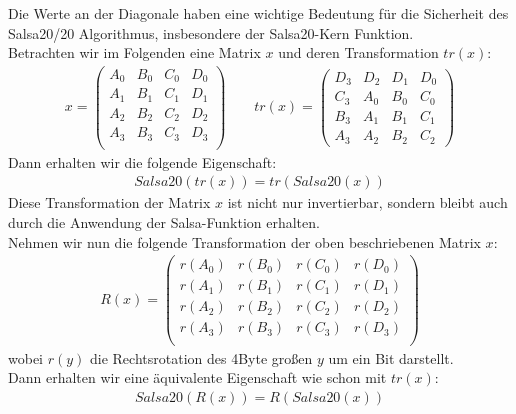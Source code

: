 \documentclass[course=erap]{aspdoc}
\begin{document}
Die Werte an der Diagonale haben eine wichtige Bedeutung für die Sicherheit des Salsa20/20 Algorithmus, insbesondere der Salsa20-Kern Funktion.
\vspace{1mm}
\\Betrachten wir im Folgenden eine Matrix $x$ und deren Transformation $tr(x)$:
\begin{gather*}
    x =
    \begin{pmatrix}
    A_0 & B_0 & C_0 & D_0\\
    A_1 & B_1 & C_1 & D_1\\
    A_2 & B_2 & C_2 & D_2\\
    A_3 & B_3 & C_3 & D_3\\
    \end{pmatrix}  
\quad \quad tr(x) = 
    \begin{pmatrix}
        D_3 & D_2 & D_1 & D_0\\
        C_3 & A_0 & B_0 & C_0\\
        B_3 & A_1 & B_1 & C_1\\
        A_3 & A_2 & B_2 & C_2
    \end{pmatrix}
\end{gather*}
Dann erhalten wir die folgende Eigenschaft:
\begin{gather*}
Salsa20( tr(x) ) = tr( Salsa20(x) )
\end{gather*}
Diese Transformation der Matrix $x$ ist nicht nur invertierbar, sondern bleibt auch durch die Anwendung der Salsa-Funktion erhalten.\cite{salsa20security} 
\vspace{1mm}
\\Nehmen wir nun die folgende Transformation der oben beschriebenen Matrix $x$:
\begin{gather*}
R(x) =
    \begin{pmatrix}
        r(A_0) & r(B_0) & r(C_0) & r(D_0)\\
        r(A_1) & r(B_1) & r(C_1) & r(D_1)\\
        r(A_2) & r(B_2) & r(C_2) & r(D_2)\\
        r(A_3) & r(B_3) & r(C_3) & r(D_3)\\
    \end{pmatrix}
\end{gather*}
wobei $r(y)$ die Rechtsrotation des 4Byte großen $y$ um ein Bit darstellt.
\vspace{1mm}
\\Dann erhalten wir eine äquivalente Eigenschaft wie schon mit $tr(x)$:
\begin{gather*}
Salsa20(R(x)) = R(Salsa20(x))
\end{gather*}
\end{document}
